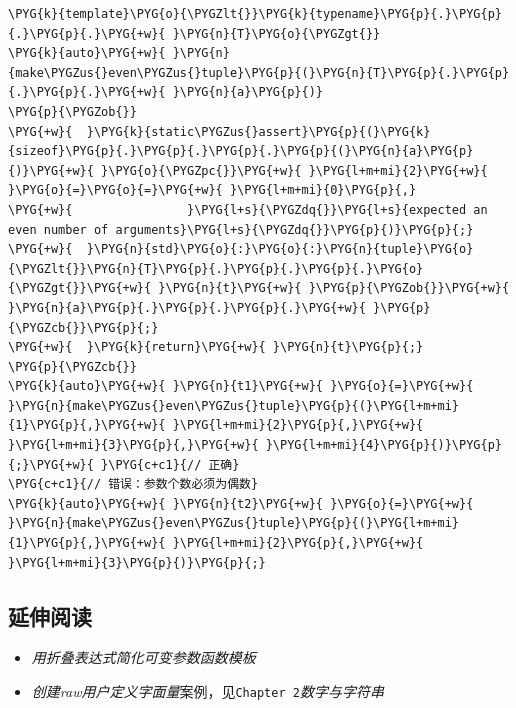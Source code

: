 \begin{codeblockbg}
\begin{Verbatim}[commandchars=\\\{\},breaklines=true,breakanywhere=true,fontsize=\codefont,xleftmargin=17bp]
\PYG{k}{template}\PYG{o}{\PYGZlt{}}\PYG{k}{typename}\PYG{p}{.}\PYG{p}{.}\PYG{p}{.}\PYG{+w}{ }\PYG{n}{T}\PYG{o}{\PYGZgt{}}
\PYG{k}{auto}\PYG{+w}{ }\PYG{n}{make\PYGZus{}even\PYGZus{}tuple}\PYG{p}{(}\PYG{n}{T}\PYG{p}{.}\PYG{p}{.}\PYG{p}{.}\PYG{+w}{ }\PYG{n}{a}\PYG{p}{)}
\PYG{p}{\PYGZob{}}
\PYG{+w}{  }\PYG{k}{static\PYGZus{}assert}\PYG{p}{(}\PYG{k}{sizeof}\PYG{p}{.}\PYG{p}{.}\PYG{p}{.}\PYG{p}{(}\PYG{n}{a}\PYG{p}{)}\PYG{+w}{ }\PYG{o}{\PYGZpc{}}\PYG{+w}{ }\PYG{l+m+mi}{2}\PYG{+w}{ }\PYG{o}{=}\PYG{o}{=}\PYG{+w}{ }\PYG{l+m+mi}{0}\PYG{p}{,}
\PYG{+w}{                }\PYG{l+s}{\PYGZdq{}}\PYG{l+s}{expected an even number of arguments}\PYG{l+s}{\PYGZdq{}}\PYG{p}{)}\PYG{p}{;}
\PYG{+w}{  }\PYG{n}{std}\PYG{o}{:}\PYG{o}{:}\PYG{n}{tuple}\PYG{o}{\PYGZlt{}}\PYG{n}{T}\PYG{p}{.}\PYG{p}{.}\PYG{p}{.}\PYG{o}{\PYGZgt{}}\PYG{+w}{ }\PYG{n}{t}\PYG{+w}{ }\PYG{p}{\PYGZob{}}\PYG{+w}{ }\PYG{n}{a}\PYG{p}{.}\PYG{p}{.}\PYG{p}{.}\PYG{+w}{ }\PYG{p}{\PYGZcb{}}\PYG{p}{;}
\PYG{+w}{  }\PYG{k}{return}\PYG{+w}{ }\PYG{n}{t}\PYG{p}{;}
\PYG{p}{\PYGZcb{}}
\PYG{k}{auto}\PYG{+w}{ }\PYG{n}{t1}\PYG{+w}{ }\PYG{o}{=}\PYG{+w}{ }\PYG{n}{make\PYGZus{}even\PYGZus{}tuple}\PYG{p}{(}\PYG{l+m+mi}{1}\PYG{p}{,}\PYG{+w}{ }\PYG{l+m+mi}{2}\PYG{p}{,}\PYG{+w}{ }\PYG{l+m+mi}{3}\PYG{p}{,}\PYG{+w}{ }\PYG{l+m+mi}{4}\PYG{p}{)}\PYG{p}{;}\PYG{+w}{ }\PYG{c+c1}{// 正确}
\PYG{c+c1}{// 错误：参数个数必须为偶数}
\PYG{k}{auto}\PYG{+w}{ }\PYG{n}{t2}\PYG{+w}{ }\PYG{o}{=}\PYG{+w}{ }\PYG{n}{make\PYGZus{}even\PYGZus{}tuple}\PYG{p}{(}\PYG{l+m+mi}{1}\PYG{p}{,}\PYG{+w}{ }\PYG{l+m+mi}{2}\PYG{p}{,}\PYG{+w}{ }\PYG{l+m+mi}{3}\PYG{p}{)}\PYG{p}{;}
\end{Verbatim}
\end{codeblockbg}



\subsection{延伸阅读}



\begin{itemize}
\item \textit{用折叠表达式简化可变参数函数模板}



\item \textit{创建raw用户定义字面量}案例，见\texttt{Chapter 2}\textit{数字与}\textit{字符串}

\end{itemize}


